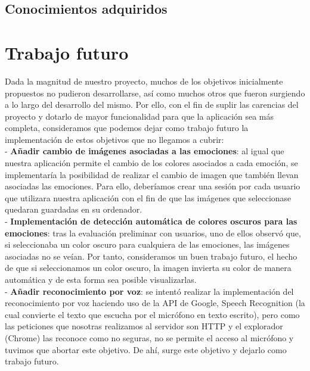 \subsection{Conocimientos adquiridos}
\label{cap11:sec:conocimientos adquiridos}

\section{Trabajo futuro}
\label{cap11:sec:trabajo futuro}

Dada la magnitud de nuestro proyecto, muchos de los objetivos inicialmente propuestos no pudieron desarrollarse, así como muchos otros que fueron surgiendo a lo largo del desarrollo del mismo.
Por ello, con el fin de suplir las carencias del proyecto y dotarlo de mayor funcionalidad para que la aplicación sea más completa, consideramos que podemos dejar como trabajo futuro la implementación de estos objetivos que no llegamos a cubrir: \\



- \textbf{Añadir cambio de imágenes asociadas a las emociones}: al igual que nuestra aplicación permite el cambio de los colores asociados a cada emoción, se implementaría la posibilidad de realizar el cambio de imagen que también llevan asociadas las emociones. Para ello, deberíamos crear una sesión por cada usuario que utilizara nuestra aplicación con el fin de que las imágenes que seleccionase quedaran guardadas en su ordenador. \\


- \textbf{Implementación de detección automática de colores oscuros para las emociones}: tras la evaluación preliminar con usuarios, uno de ellos observó que, si seleccionaba un color oscuro para cualquiera de las emociones, las imágenes asociadas no se veían. Por tanto, consideramos un buen trabajo futuro, el hecho de que si seleccionamos un color oscuro, la imagen invierta su color de manera automática y de esta forma sea posible visualizarlas.\\ 



- \textbf{Añadir reconocimiento por voz}: se intentó realizar la implementación del reconocimiento por voz haciendo uso de la API de Google, Speech Recognition (la cual convierte el texto que escucha por el micrófono en texto escrito), pero como las peticiones que nosotras realizamos al servidor son HTTP y el explorador (Chrome) las reconoce como no seguras, no se permite el acceso al micrófono y tuvimos que abortar este objetivo. De ahí, surge este objetivo y dejarlo como trabajo futuro. \\



